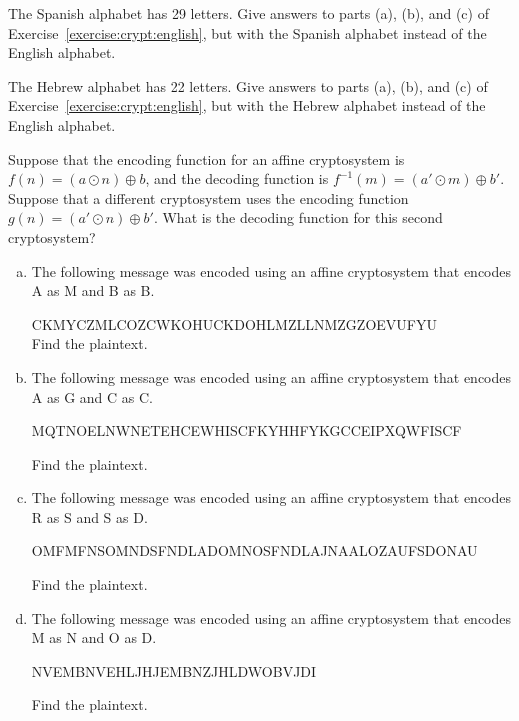 \begin{exercise}{}
The Spanish alphabet has 29 letters. Give answers to parts (a), (b), and (c) of Exercise~\ref{exercise:crypt:english}, but with the Spanish alphabet instead of the English alphabet.
\end{exercise}

\begin{exercise}{}
The Hebrew alphabet has  22 letters. Give answers to parts (a), (b), and (c) of Exercise~\ref{exercise:crypt:english}, but with the Hebrew alphabet instead of the English alphabet.
\end{exercise}

\begin{exercise}{}
Suppose that the encoding function for an affine cryptosystem is $f(n) = (a \odot n) \oplus  b$, and the decoding function is 
$f^{-1}(m) = (a' \odot m) \oplus  b'$. Suppose that a different cryptosystem uses the encoding function $g(n) = (a' \odot n) \oplus  b'$. What is the decoding function for this second cryptosystem?
\end{exercise}

\begin{exercise}{}
\begin{enumerate}[(a)]
\item
The following message was encoded using an affine cryptosystem that encodes A as M and B as B. 
\medskip

CKMYCZMLCOZCWKOHUCKDOHLMZLLNMZGZOEVUFYU\\

\noindent
Find the plaintext.
\item
The following message was encoded using an affine cryptosystem that encodes A as G and C as C.
\medskip

MQTNOELNWNETEHCEWHISCFKYHHFYKGCCEIPXQWFISCF

\noindent
Find the plaintext.
\item
The following message was encoded using an affine cryptosystem that encodes R as S and S as D.
\medskip

OMFMFNSOMNDSFNDLADOMNOSFNDLAJNAALOZAUFSDONAU

\noindent
Find the plaintext.

\item
The following message was encoded using an affine cryptosystem that encodes M as N and O as D.
\medskip

NVEMBNVEHLJHJEMBNZJHLDWOBVJDI

\noindent
Find the plaintext.

\end{enumerate}
\end{exercise}


